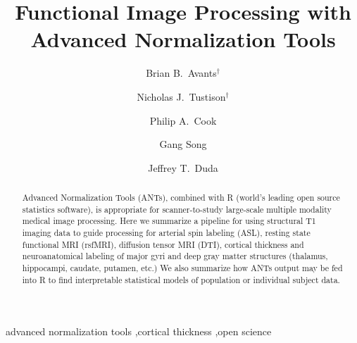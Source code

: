 \documentclass[preprint,1p,times]{elsarticle}
\begin{document}
\begin{frontmatter}

\title{Functional Image Processing with Advanced Normalization Tools}

\author[label1]{Brian B.~Avants$^\dagger$}
\author[label2]{Nicholas J.~Tustison$^\dagger$
  }
\author[label1]{Philip A.~Cook}
\author[label1]{Gang Song}
\author[label1]{Jeffrey T.~Duda}
\address[label1]{Penn Image Computing and Science Laboratory, University of Pennsylvania, Philadelphia, PA}
\address[label2]{Department of Radiology and Medical Imaging, University of Virginia, Charlottesville, VA}

\begin{abstract} 
Advanced Normalization Tools (ANTs), combined with R (world's leading
open source statistics software), is appropriate for scanner-to-study
large-scale multiple modality medical image processing.  Here we
summarize a pipeline for using structural T1 imaging data to guide
processing for arterial spin labeling (ASL), resting state functional
MRI (rsfMRI), diffusion tensor MRI (DTI), cortical thickness and
neuroanatomical labeling of major gyri and deep gray matter structures
(thalamus, hippocampi, caudate, putamen, etc.)  We also summarize how
ANTs output may be fed into R to find interpretable statistical models
of population or individual subject data.
\end{abstract}

\begin{keyword}
advanced normalization tools \sep cortical thickness \sep open science
\end{keyword}

\end{frontmatter}
%
%
\newpage
\end{document}
